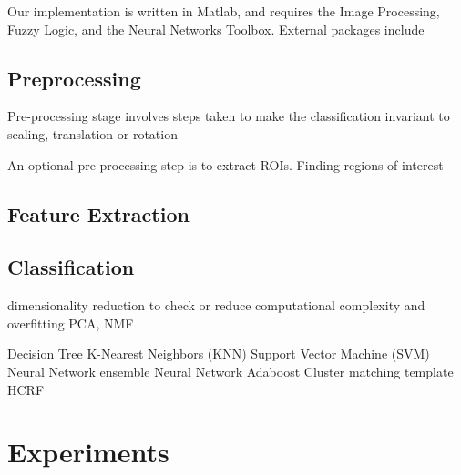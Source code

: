 \documentclass[10pt,twocolumn,letterpaper]{article}
\begin{document}
Our implementation is written in Matlab, and requires the Image Processing, Fuzzy Logic, and the Neural Networks Toolbox. External packages include 

\subsection{Preprocessing}
Pre-processing stage involves steps taken to make the classification invariant to scaling, translation or rotation


An optional pre-processing step is to extract ROIs. 
Finding regions of interest

\subsection{Feature Extraction}

\subsection{Classification}

dimensionality reduction to check or reduce computational complexity and overfitting
PCA, NMF


Decision Tree
K-Nearest Neighbors (KNN)
Support Vector Machine (SVM)
Neural Network
ensemble Neural Network
Adaboost
Cluster matching template
HCRF


\section{Experiments} 
\end{document}
